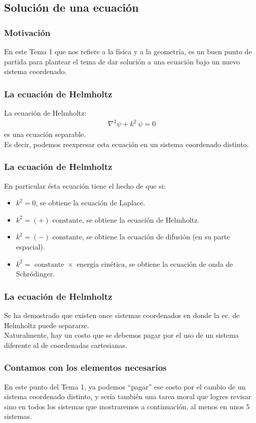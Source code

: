 \documentclass[12pt]{beamer}
\begin{document}
\subsection{Solución de una ecuación}

\begin{frame}
\frametitle{Motivación}
En este Tema 1 que nos refiere a la física y a la geometría, es un buen punto de partida para plantear el tema de dar solución a una ecuación bajo un nuevo sistema coordenado.
\end{frame}
\begin{frame}
\frametitle{La ecuación de Helmholtz}
La ecuación de Helmholtz:
\begin{align*}
\nabla^{2} \psi + k^{2} \: \psi = 0
\end{align*}
es una ecuación separable.
\\
\bigskip
\pause
Es decir, podemos reexpresar esta ecuación en un sistema coordenado distinto.
\end{frame}
\begin{frame}
\frametitle{La ecuación de Helmholtz}
En particular ésta ecuación tiene el hecho de que si:
\begin{itemize}[<+->]
\item $k^{2} = 0$, se obtiene la ecuación de Laplace.
\item $k^{2} = (+) \mbox{ constante}$, se obtiene la ecuación de Helmholtz.
\item $k^{2} = (-) \mbox{ constante}$, se obtiene la ecuación de difusión (en su parte espacial).
\item $k^{2} = \mbox{ constante } \times \mbox{ energía cinética}$, se obtiene la ecuación de onda de Schrödinger.
\end{itemize}
\end{frame}
\begin{frame}
\frametitle{La ecuación de Helmholtz}
Se ha demostrado que existen once sistemas coordenados en donde la ec. de Helmholtz puede separarse. 
\\
\bigskip
\pause
Naturalmente, hay un costo que se debemos pagar por el uso de un sistema diferente al de coordenadas cartesianas.
\end{frame}
\begin{frame}
\frametitle{Contamos con los elementos necesarios}
En este punto del Tema 1, ya podemos \enquote{pagar} ese costo por el cambio de un sistema coordenado distinto, y sería también una tarea moral que logres revisar sino en todos los sistemas que mostraremos a continuación, al menos en unos $5$ sistemas.
\end{frame}
\end{document}
